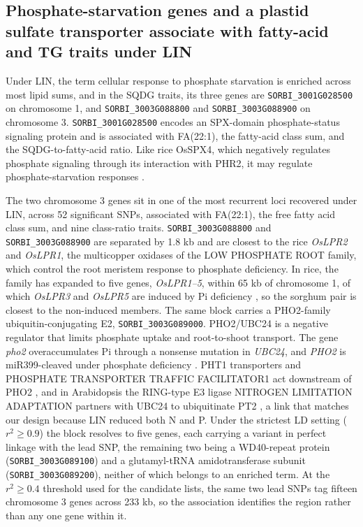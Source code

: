 \documentclass[9pt,twocolumn,twoside]{rilabRxiv}
\begin{document}
\subsection*{Phosphate-starvation genes and a plastid sulfate transporter associate with fatty-acid and TG traits under LIN}

Under LIN, the term cellular response to phosphate starvation is enriched across most lipid sums, and in the SQDG traits, its three genes are \texttt{SORBI\_3001G028500} on chromosome 1, and \texttt{SORBI\_3003G088800} and \texttt{SORBI\_3003G088900} on chromosome 3. \texttt{SORBI\_3001G028500} encodes an SPX-domain phosphate-status signaling protein and is associated with FA(22:1), the fatty-acid class sum, and the SQDG-to-fatty-acid ratio. Like rice OsSPX4, which negatively regulates phosphate signaling through its interaction with PHR2, it may regulate phosphate-starvation responses \citep{Lv2014SPX4}.

The two chromosome 3 genes sit in one of the most recurrent loci recovered under LIN, across 52 significant SNPs, associated with FA(22:1), the free fatty acid class sum, and nine class-ratio traits. \texttt{SORBI\_3003G088800} and \texttt{SORBI\_3003G088900} are separated by 1.8 kb and are closest to the rice \textit{OsLPR2} and \textit{OsLPR1}, the multicopper oxidases of the LOW PHOSPHATE ROOT family, which control the root meristem response to phosphate deficiency. In rice, the family has expanded to five genes, \textit{OsLPR1--5}, within 65 kb of chromosome 1, of which \textit{OsLPR3} and \textit{OsLPR5} are induced by Pi deficiency \citep{Cao2016OsLPR}, so the sorghum pair is closest to the non-induced members. The same block carries a PHO2-family ubiquitin-conjugating E2, \texttt{SORBI\_3003G089000}. PHO2/UBC24 is a negative regulator that limits phosphate uptake and root-to-shoot transport. The gene \textit{pho2} overaccumulates Pi through a nonsense mutation in \textit{UBC24}, and \textit{PHO2} is miR399-cleaved under phosphate deficiency \citep{Aung2006PHO2}. PHT1 transporters and PHOSPHATE TRANSPORTER TRAFFIC FACILITATOR1 act downstream of PHO2 \citep{Huang2013PHO2}, and in Arabidopsis the RING-type E3 ligase NITROGEN LIMITATION ADAPTATION partners with UBC24 to ubiquitinate PT2 \citep{Park2014NLA}, a link that matches our design because LIN reduced both N and P. Under the strictest LD setting ($r^2 \geq 0.9$) the block resolves to five genes, each carrying a variant in perfect linkage with the lead SNP, the remaining two being a WD40-repeat protein (\texttt{SORBI\_3003G089100}) and a glutamyl-tRNA amidotransferase subunit (\texttt{SORBI\_3003G089200}), neither of which belongs to an enriched term. At the $r^2 \geq 0.4$ threshold used for the candidate lists, the same two lead SNPs tag fifteen chromosome 3 genes across 233 kb, so the association identifies the region rather than any one gene within it.
\end{document}
